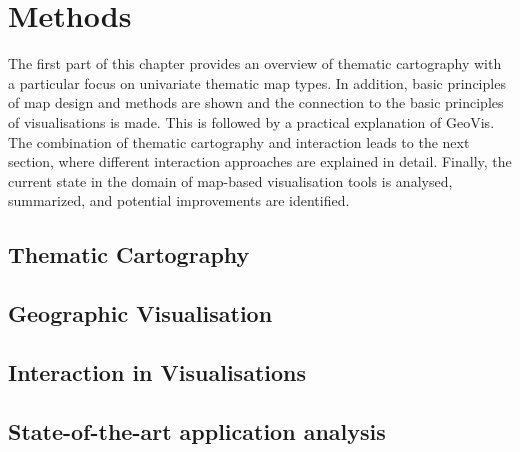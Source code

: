 \section{Methods}
The first part of this chapter provides an overview of thematic cartography with a particular focus on univariate thematic map types. In addition, basic principles of map design and methods are shown and the connection to the basic principles of visualisations is made. This is followed by a practical explanation of \ac{GeoVis}. 
The combination of thematic cartography and interaction leads to the next section, where different interaction approaches are explained in detail. Finally, the current state in the domain of map-based visualisation tools is analysed, summarized, and potential improvements are identified.

\subsection{Thematic Cartography}
\label{s:cartography}


\subsection{Geographic Visualisation}
\label{s:geovis-practical}


\subsection{Interaction in Visualisations}
\label{s:interaction}


\subsection{State-of-the-art application analysis}
